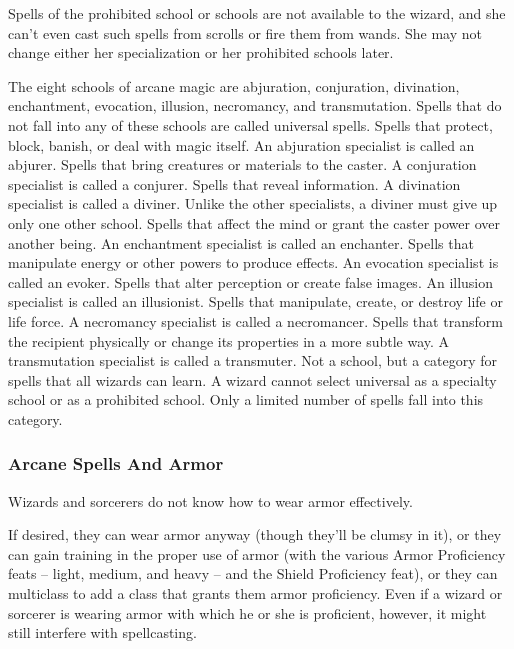 Spells of the prohibited school or schools are not available to the wizard, and she
can't even cast such spells from scrolls or fire them from wands. She
may not change either her specialization or her prohibited schools later.
\par The eight schools of arcane magic are abjuration, conjuration,
divination, enchantment, evocation, illusion, necromancy, and transmutation. Spells that do not fall into any of these schools are called universal spells.
 Spells that protect, block, banish, or deal with magic itself. An abjuration specialist is called an abjurer.
 Spells that bring creatures or materials to the caster. A
conjuration specialist is called a conjurer.
 Spells that reveal information. A divination specialist is
called a diviner. Unlike the other specialists, a diviner must give up only
one other school.
 Spells that affect the mind or grant the caster power over another being. An enchantment specialist is called an enchanter.
 Spells that manipulate energy or other powers to produce effects. An evocation specialist is called an evoker.
 Spells that alter perception or create false images. An illusion
specialist is called an illusionist.
 Spells that manipulate, create, or destroy life or life force.
A necromancy specialist is called a necromancer.
 Spells that transform the recipient physically or change
its properties in a more subtle way. A transmutation specialist is called a
transmuter.
 Not a school, but a category for spells that all wizards can
learn. A wizard cannot select universal as a specialty school or as a
prohibited school. Only a limited number of spells fall into this category.

\subsubsection{Arcane Spells And Armor}
Wizards and sorcerers do not know how to wear armor effectively.

If desired, they can wear armor anyway (though they'll be clumsy in it), or they can gain training in the proper use of armor (with the various Armor Proficiency feats -- light, medium, and heavy -- and the Shield Proficiency feat), or they can multiclass to add a class that grants them armor proficiency. Even if a wizard or sorcerer is wearing armor with which he or she is proficient, however, it might still interfere with spellcasting.

